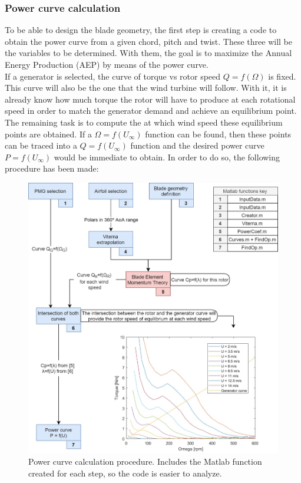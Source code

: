 \documentclass[../TFG_Report.tex]{subfiles}
\begin{document}
\subsubsection{Power curve calculation}

To be able to design the blade geometry, the first step is creating a code to obtain the power curve from a given chord, pitch and twist. These three will be the variables to be determined. With them, the goal is to maximize the Annual Energy Production (AEP) by means of the power curve. \\

If a generator is selected, the curve of torque vs rotor speed $Q=f(\Omega)$ is fixed. This curve will also be the one that the wind turbine will follow. With it, it is already know how much torque the rotor will have to produce at each rotational speed in order to match the generator demand and achieve an equilibrium point. The remaining task is to compute the at which wind speed these equilibrium points are obtained. If a $\Omega = f(U_{\infty})$ function can be found, then these points can be traced into a $Q=f(U_{\infty})$ function and the desired power curve $P=f(U_{\infty})$ would be immediate to obtain. In order to do so, the following procedure has been made: 


\begin{figure}[h!]
	\centering
	\includegraphics[width=1\linewidth]{Images/Power_curve_procedure_image}
	\caption[Power curve calculation procedure]{Power curve calculation procedure. Includes the Matlab function created for each step, so the code is easier to analyze.}
	\label{fig:PowerCurveScheme}
\end{figure}
\end{document}
